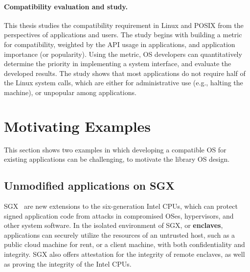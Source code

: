 \paragraph{Compatibility evaluation and study.}
This thesis studies the compatibility requirement in Linux and POSIX
from the perspectives of applications and users.
The study begins with building a metric for compatibility,
weighted by the API usage in applications,
and application importance (or popularity).
Using the metric,
OS developers can quantitatively determine the priority in implementing a system interface,
and evaluate the developed results.
The study shows that most applications do not require
half of the Linux system calls,
which are either for administrative use (e.g., halting the machine), or unpopular among applications.



\section{Motivating Examples}

This section shows two examples in which developing a compatible OS for existing applications can be challenging, to motivate the library OS design.


\subsection{Unmodified applications on SGX}
\label{sec:intro:sgx}


SGX~\cite{intelsgx} are new extensions to the six-generation Intel CPUs,
which can
protect signed application code from attacks in compromised OSes, hypervisors, and other system software.
In the isolated environment of SGX, or {\bf enclaves}, applications can securely utilize the
resources of an untrusted host,
such as a public cloud machine for rent, or a client machine,
with both confidentiality and integrity.
SGX also offers attestation for the integrity of remote enclaves, as well as proving the integrity of the Intel CPUs.


